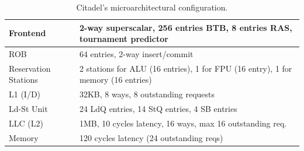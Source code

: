 \begin{table}
\begin{tabular}{ | m{5em} | m{17em} | } 
  \hline
  Frontend & 2-way superscalar, 256 entries BTB, 8 entries RAS, tournament predictor \\
  \hline
  ROB &  64 entries, 2-way insert/commit \\
  \hline
  Reservation Stations & 2 stations for ALU (16 entries), 1 for FPU (16 entry), 1 for memory (16 entries) \\
  \hline
  L1 (I/D) &  32KB, 8 ways, 8 outstanding requests \\
  \hline
  Ld-St Unit & 24 LdQ entries, 14 StQ entries, 4 SB entries\\
  \hline
  LLC (L2) & 1MB, 10 cycles latency, 16 ways, max 16 outstanding req. \\
  \hline
  Memory &  120 cycles latency (24 outstanding reqs) \\
  \hline
\end{tabular}
    \caption{Citadel's microarchitectural configuration.}
    \label{tab:mi6param}
\end{table}
